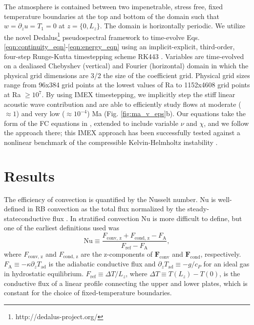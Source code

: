 \documentclass[aps, prl, twocolumn, nofootinbib, groupedaddress, amsfonts, amssymb, amsmath]{revtex4-1}
\begin{document}
The atmosphere is contained between two impenetrable, stress free, fixed temperature boundaries at
the top and bottom of the domain such that $w = \partial_z u = T_1 = 0$ at $z = \{0, L_z\}$. The domain
is horizontally periodic. We utilize the novel Dedalus\footnote{http://dedalus-project.org/} pseudospectral framework 
 to time-evolve Eqs. 
\ref{eqn:continuity_eqn}-\ref{eqn:energy_eqn} using an implicit-explicit, third-order, four-step 
Runge-Kutta timestepping scheme RK443 \cite{ascher&all1997}.  
Variables are time-evolved on a dealiased Chebyshev (vertical)
and Fourier (horizontal) domain in which the
physical grid dimensions are 3/2 the size of the coefficient grid.  Physical grid sizes range from
96x384 grid points at the lowest values of Ra to 1152x4608 grid points at Ra $\geq 10^{7}$. 
By using IMEX timestepping, we implicitly step the stiff linear acoustic wave contribution and are able to
efficiently study flows at moderate ($\approx 1$) and very low ($\approx 10^{-4}$)
Ma (Fig. \ref{fig:ma_v_eps}b).  Our equations take the form
of the FC equations in \cite{lecoanet&all2014}, extended to include variable
$\nu$ and $\chi$, and we follow the approach there; this IMEX approach has been successfully 
tested against a nonlinear benchmark  of the compressible Kelvin-Helmholtz instability \cite{Lecoanet_et_al_2016_KH}.

\section{Results}
\label{sec:results}

The efficiency of convection is quantified by the Nusselt number.  
Nu is well-defined in RB convection
as the total flux normalized by the steady-stateconductive flux 
\cite{johnston&doering2009, otero&all2002}.
In stratified convection Nu is more difficult to define, but one of the earliest definitions used
was \cite{graham1975,hurlburt&all1984}
\begin{equation}
\text{Nu} \equiv \frac{F_{\text{conv, z}} + F_{\text{cond, z}} - F_{\text{A}}}{F_{\text{ref}} - F_{\text{A}}},
\label{eqn:nusselt}
\end{equation}
where $F_{\text{conv, z}}$ and $F_{\text{cond, z}}$ are the z-components of $\bm{F}_{\text{conv}}$ and $\bm{F}_{\text{cond}}$,
respectively.  $F_{\text{A}} \equiv -\kappa \partial_z T_{\text{ad}}$ is the adiabatic conductive flux and
$\partial_z T_{\text{ad}} \equiv - g / c_{P}$ for an ideal gas in hydrostatic equilibrium.
$F_{\text{ref}} \equiv \Delta T / L_z$, where $\Delta T \equiv T(L_z) - T(0)$, is the 
conductive flux of a linear profile connecting the upper
and lower plates, which is constant for the choice of fixed-temperature boundaries.
\end{document}
